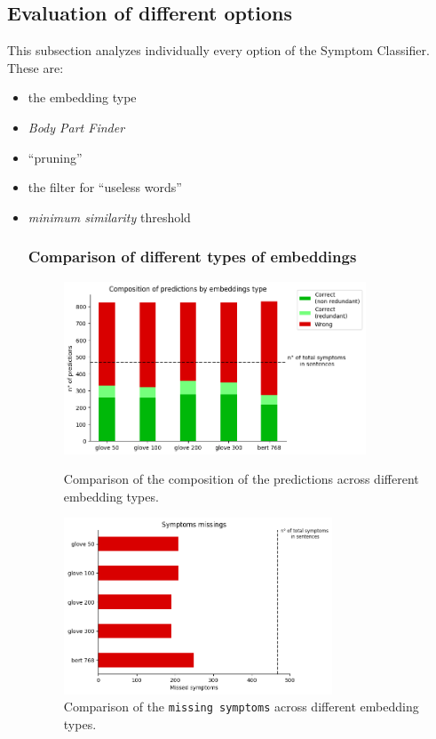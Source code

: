 \subsection{Evaluation of different options}
\label{sec:evaluationoptions}
This subsection analyzes individually every option of the Symptom Classifier. These are: 
\begin{itemize}
  \item the embedding type
  \item \textit{Body Part Finder}
  \item ``pruning''
  \item the filter for ``useless words''
  \item \textit{minimum similarity} threshold

\subsubsection{Comparison of different types of embeddings}

\begin{figure}[h]%
  \centering
  \begin{minipage}[b]{0.4\textwidth}
    \includegraphics[width=9cm]{graphs/comparison_embeddings_type}
    \caption{Comparison of the composition of the predictions across different embedding types.}
  \end{minipage}
  \hfill
  \begin{minipage}[b]{0.4\textwidth}
    \includegraphics[width=8cm]{graphs/comparison_embeddings_type_missings}
    \caption{Comparison of the \texttt{missing symptoms} across different embedding types.}
  \end{minipage}
\end{figure}


\end{itemize}
